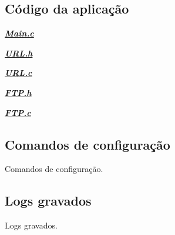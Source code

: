 \documentclass[a4paper]{article}
\begin{document}
\subsection{Código da aplicação}
\newenvironment{changemargin}[2]{%
\begin{list}{}{%
\setlength{\topsep}{0pt}%
\setlength{\leftmargin}{#1}%
\setlength{\rightmargin}{#2}%
\setlength{\listparindent}{\parindent}%
\setlength{\itemindent}{\parindent}%
\setlength{\parsep}{\parskip}%
}%
\item[]}{
\end{list}}

{\underline{\textit{\textbf{Main.c}}}}

\begin{changemargin}{-3cm}{-4cm}
{\small}
\end{changemargin}

{\underline{\textit{\textbf{URL.h}}}}

\begin{changemargin}{-3cm}{-4cm}
{\small}
\end{changemargin}

{\underline{\textit{\textbf{URL.c}}}}

\begin{changemargin}{-3cm}{-4cm}
{\small}
\end{changemargin}

{\underline{\textit{\textbf{FTP.h}}}}

\begin{changemargin}{-3cm}{-4cm}

\end{changemargin}

{\underline{\textit{\textbf{FTP.c}}}}

\begin{changemargin}{-3cm}{-4cm}
{\small}
\end{changemargin}

\subsection{Comandos de configuração}
Comandos de configuração.

\subsection{Logs gravados}
Logs gravados.
\end{document}
